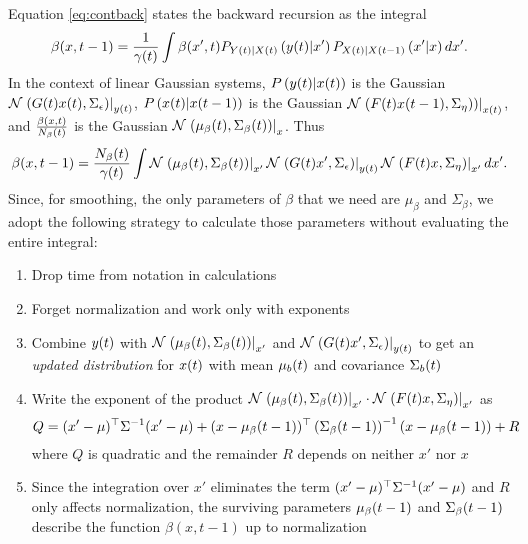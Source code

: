 Equation \eqref{eq:contback} states the backward recursion as the
integral
\begin{equation*}
  \beta(x,t-1) =  
  \frac{1}{{\gamma}{(t)}} \int\beta(x',t)
  P_{{Y}{(t)}|{X}{(t)}}\left({y}{(t)}|x' \right)
  P_{{X}{(t)}|{X}{(t-1)}}\left(x'|x \right) dx'.
\end{equation*}
In the context of linear Gaussian systems, $P
\left({y}{(t)}|{x}{(t)} \right)$ is the Gaussian
${\mathcal{N}}\left.\left({G}{(t)}{x}{(t)},\Sigma_\epsilon\right)\right|_{{y}{(t)}}$, $P
\left({x}{(t)}|{x}{(t-1)}\right) $ is the Gaussian $
{\mathcal{N}}\left.\left({F}{(t)} {x}{(t-1)},\Sigma_\eta)\right)\right|_{{x}{(t)}}$, and
$\frac{\beta(x,t)}{{N_\beta}{(t)}} $ is the Gaussian $
{\mathcal{N}}\left.\left({\mu_\beta}{(t)},{\Sigma_\beta}{(t)}\right)\right|_{x}$.  Thus
\begin{equation*}
  \beta(x,t-1) =  
  \frac{{N_\beta}{(t)}}{{\gamma}{(t)}} \int
  {\mathcal{N}}\left.\left({\mu_\beta}{(t)},{\Sigma_\beta}{(t)}\right)\right|_{x'}
  {\mathcal{N}}\left.\left({G}{(t)}x',\Sigma_\epsilon\right)\right|_{{y}{(t)}}
  {\mathcal{N}}\left.\left({F}{(t)}x,\Sigma_\eta\right)\right|_{x'}   dx'.
\end{equation*}
Since, for smoothing, the only parameters of $\beta$ that we need are
$\mu_\beta$ and $\Sigma_\beta$, we adopt the following strategy to
calculate those parameters without evaluating the entire integral:
\begin{enumerate}
\item \label{BackList1} Drop time from notation in calculations
\item \label{BackList2} Forget normalization and work only with exponents
\item \label{BackList3} Combine ${y}{(t)}$ with
  ${\mathcal{N}}\left.\left({\mu_\beta}{(t)},{\Sigma_\beta}{(t)}\right)\right|_{x'}$ and
  ${\mathcal{N}}\left.\left({G}{(t)}x',\Sigma_\epsilon\right)\right|_{{y}{(t)}}$ to get an
  \emph{updated distribution} for ${x}{(t)}$ with mean
  ${\mu_b}{(t)}$ and covariance ${\Sigma_b}{(t)}$
\item \label{BackList4} Write the exponent of the product
  ${\mathcal{N}}\left.\left({\mu_\beta}{(t)},{\Sigma_\beta}{(t)}\right)\right|_{x'} \cdot
  {\mathcal{N}}\left.\left({F}{(t)}x,\Sigma_\eta\right)\right|_{x'}$ as
  \begin{equation*}
    Q = (x' - \mu)^\top \Sigma^{-1} (x' - \mu) +
    (x - {\mu_\beta}{(t-1)})^\top \left({\Sigma_\beta}{(t-1)}
    \right)^{-1}(x - {\mu_\beta}{(t-1)}) + R
  \end{equation*}
  where $Q$ is quadratic and the remainder $R$ depends on neither $x'$
  nor $x$
\item \label{BackList5} Since the integration over $x'$ eliminates the
  term $(x' - \mu)^\top \Sigma^{-1} (x' - \mu)$ and $R$ only
  affects normalization, the surviving parameters
  ${\mu_\beta}{(t-1)}$ and ${\Sigma_\beta}{(t-1)}$ describe the
  function $\beta(x,t-1)$ up to normalization
\end{enumerate}

